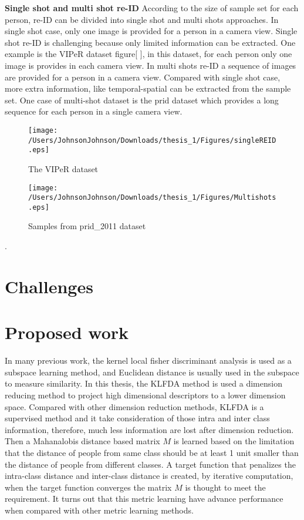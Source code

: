 \textbf{Single shot and multi shot re-ID} According to the size of sample set for each person, re-ID can be divided into single shot and multi shots approaches. In single shot case, only one image is provided for a person in a camera view. Single shot re-ID is challenging because only limited information can be extracted. One example is the VIPeR dataset figure[ ], in this dataset, for each person only one image is provides in each camera view. In multi shots re-ID a sequence of images are provided for a person in a camera view. Compared with single shot case, more extra information, like temporal-spatial can be extracted from the sample set. One case of multi-shot dataset is the prid dataset which provides a long sequence for each person in a single camera view.

\begin{figure}[H]

\texttt{[image: /Users/JohnsonJohnson/Downloads/thesis\_1/Figures/singleREID.eps]}
\vspace{-2em}
\caption{The VIPeR dataset}

\end{figure}

\begin{figure}[H]

\texttt{[image: /Users/JohnsonJohnson/Downloads/thesis\_1/Figures/Multishots.eps]}
\vspace{-2em}
\caption{Samples from prid\_2011 dataset}

\end{figure}


.

\section{Challenges}


\section{Proposed work}
In many previous work, the kernel local fisher discriminant analysis is used as a subspace learning method, and Euclidean distance is usually used in the subspace to measure similarity. In this thesis, the KLFDA method is used a dimension reducing method to project high dimensional descriptors to a lower dimension space. Compared with other dimension reduction methods, KLFDA is a supervised method and it take consideration of those intra and inter class information, therefore, much less information are lost after dimension reduction. Then a Mahanalobis distance based matrix $M$ is learned based on the limitation that the distance of people from same class should be at least 1 unit smaller than the distance of people from different classes. A target function that penalizes the intra-class distance and inter-class distance is created, by iterative computation, when the target function converges the matrix $M$ is thought to meet the requirement. It turns out that this metric learning have advance performance when compared with other metric learning methods.



